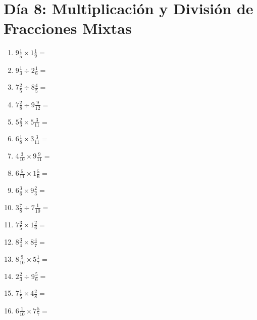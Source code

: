 \documentclass[12pt]{article}
\begin{document}
\section*{Día 8: Multiplicación y División de Fracciones Mixtas}
\begin{enumerate}
\item \large $ 9 \frac{1}{5} \times 1 \frac{1}{9} = $ \vspace{1.6cm}
\item \large $ 9 \frac{1}{3} \div 2 \frac{1}{6} = $ \vspace{1.6cm}
\item \large $ 7 \frac{2}{5} \div 8 \frac{4}{5} = $ \vspace{1.6cm}
\item \large $ 7 \frac{2}{8} \div 9 \frac{9}{12} = $ \vspace{1.6cm}
\item \large $ 5 \frac{2}{3} \times 5 \frac{3}{11} = $ \vspace{1.6cm}
\item \large $ 6 \frac{1}{8} \times 3 \frac{3}{11} = $ \vspace{1.6cm}
\item \large $ 4 \frac{3}{10} \times 9 \frac{9}{11} = $ \vspace{1.6cm}
\item \large $ 6 \frac{5}{11} \times 1 \frac{5}{6} = $ \vspace{1.6cm}
\item \large $ 6 \frac{3}{6} \times 9 \frac{2}{3} = $ \vspace{1.6cm}
\item \large $ 3 \frac{7}{8} \div 7 \frac{1}{10} = $ \vspace{1.6cm}
\newpage
\item \large $ 7 \frac{3}{5} \times 1 \frac{2}{6} = $ \vspace{1.6cm}
\item \large $ 8 \frac{3}{4} \times 8 \frac{4}{7} = $ \vspace{1.6cm}
\item \large $ 8 \frac{9}{10} \times 5 \frac{1}{7} = $ \vspace{1.6cm}
\item \large $ 2 \frac{2}{3} \div 9 \frac{5}{6} = $ \vspace{1.6cm}
\item \large $ 7 \frac{1}{5} \times 4 \frac{2}{8} = $ \vspace{1.6cm}
\item \large $ 6 \frac{1}{10} \times 7 \frac{5}{7} = $ \vspace{1.6cm}

\end{enumerate}
\end{document}
